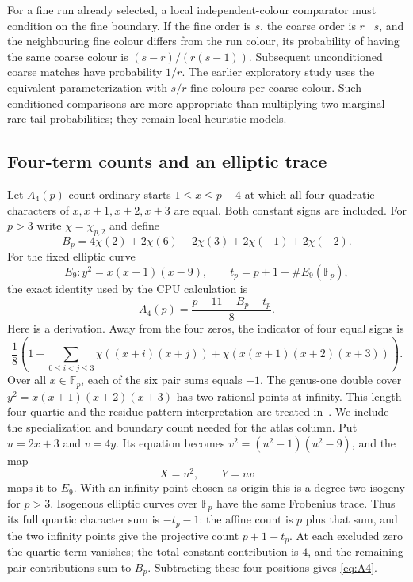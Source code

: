 \documentclass[11pt]{article}
\theoremstyle{definition}\newtheorem{definition}[theorem]{Definition}
\newcommand{\Fp}{\mathbb F_p}
\begin{document}
For a fine run already selected, a local independent-colour comparator
must condition on the fine boundary. If the fine order is $s$, the
coarse order is $r\mid s$, and the neighbouring fine colour differs
from the run colour, its probability of having the same coarse colour
is $(s-r)/(r(s-1))$. Subsequent unconditioned coarse matches have
probability $1/r$. The earlier exploratory study uses the equivalent
parameterization with $s/r$ fine colours per coarse colour. Such
conditioned comparisons are more appropriate than multiplying two
marginal rare-tail probabilities; they remain local heuristic models.

\subsection{Four-term counts and an elliptic trace}\label{sec:A4}
Let $A_4(p)$ count ordinary starts $1\le x\le p-4$ at which all four
quadratic characters of $x,x+1,x+2,x+3$ are equal. Both constant signs
are included. For $p>3$ write $\chi=\chi_{p,2}$ and define
\[
 B_p=4\chi(2)+2\chi(6)+2\chi(3)+2\chi(-1)+2\chi(-2).
\]
For the fixed elliptic curve
\[
 E_9:y^2=x(x-1)(x-9),\qquad t_p=p+1-\#E_9(\Fp),
\]
the exact identity used by the CPU calculation is
\begin{equation}\label{eq:A4}
 A_4(p)=\frac{p-11-B_p-t_p}{8}.
\end{equation}
Here is a derivation. Away from the four zeros, the indicator of four
equal signs is
\[
 \frac18\left(1+\sum_{0\le i<j\le3}\chi((x+i)(x+j))
                   +\chi(x(x+1)(x+2)(x+3))\right).
\]
Over all $x\in\Fp$, each of the six pair sums equals $-1$. The
genus-one double cover $y^2=x(x+1)(x+2)(x+3)$ has two rational points
at infinity. This length-four quartic and the residue-pattern
interpretation are treated in~\cite[Section 2.3]{patterns}.
We include the specialization and boundary count needed for the
atlas column. Put $u=2x+3$ and $v=4y$. Its equation becomes
$v^2=(u^2-1)(u^2-9)$, and the map
\[
 X=u^2,\qquad Y=uv
\]
maps it to $E_9$. With an infinity point chosen as origin this is a
degree-two isogeny for $p>3$. Isogenous elliptic curves over $\Fp$
have the same Frobenius trace. Thus its full quartic character sum
is $-t_p-1$: the affine count is $p$ plus that sum, and the two
infinity points give the projective count $p+1-t_p$. At each excluded
zero the quartic term vanishes; the total constant contribution is
$4$, and the remaining pair contributions sum to $B_p$. Subtracting
these four positions gives \eqref{eq:A4}.
\end{document}
